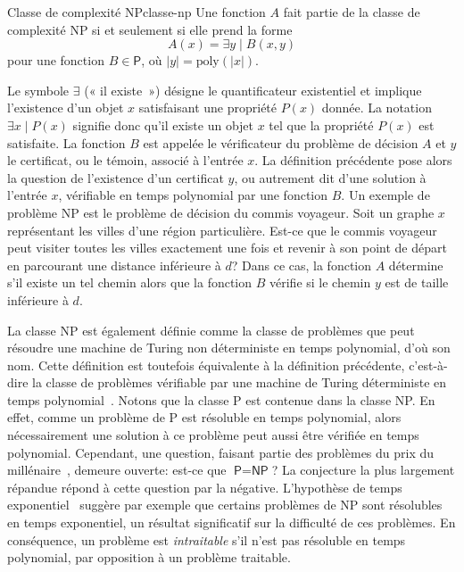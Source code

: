 \begin{maindefinition}{Classe de complexité \textsf{NP}}{classe-np}
    Une fonction $A$ fait partie de la classe de complexité \textsf{NP} si et seulement si elle prend la forme
    \begin{equation*}
        A(x) = \exists y \mid B(x,y)
    \end{equation*}
    pour une fonction $B \in  \textsf{P}$, où $\lvert y \rvert = \mathrm{poly}(\lvert x \rvert)$.
\end{maindefinition}

Le symbole $\exists$ (« il existe ») désigne le quantificateur existentiel et  implique l'existence d'un objet $x$ satisfaisant une propriété $P(x)$ donnée. La notation $\exists x \mid P(x)$ signifie donc qu'il existe un objet $x$ tel que la propriété $P(x)$ est satisfaite. La fonction $B$ est appelée le vérificateur du problème de décision $A$ et $y$ le certificat, ou le témoin, associé à l'entrée $x$. La définition précédente pose alors la question de l'existence d'un certificat $y$, ou autrement dit d'une solution à l'entrée $x$, vérifiable en temps polynomial par une fonction $B$. Un exemple de problème \textsf{NP} est le problème de décision du commis voyageur. Soit un graphe $x$ représentant les villes d'une région particulière. Est-ce que le commis voyageur peut visiter toutes les villes exactement une fois et revenir à son point de départ en parcourant une distance inférieure à $d$? Dans ce cas, la fonction $A$ détermine s'il existe un tel chemin alors que la fonction $B$ vérifie si le chemin $y$ est de taille inférieure à $d$.

La classe \textsf{NP} est également définie comme la classe de problèmes que peut résoudre une machine de Turing non déterministe en temps polynomial, d'où son nom. Cette définition est toutefois équivalente à la définition précédente, c'est-à-dire la classe de problèmes vérifiable par une machine de Turing déterministe en temps polynomial~\cite{sipserIntroductionTheoryComputation1996}. Notons que la classe \textsf{P} est contenue dans la classe \textsf{NP}. En effet, comme un problème de \textsf{P} est résoluble en temps polynomial, alors nécessairement une solution à ce problème peut aussi être vérifiée en temps polynomial. Cependant, une question, faisant partie des problèmes du prix du millénaire~\cite{carlsonMillenniumPrizeProblems2006}, demeure ouverte: est-ce que $\textsf{P} = \textsf{NP}$? La conjecture la plus largement répandue répond à cette question par la négative. L'hypothèse de temps exponentiel~\cite{impagliazzoComplexityKSAT2001} suggère par exemple que certains problèmes de \textsf{NP} sont résolubles en temps exponentiel, un résultat significatif sur la difficulté de ces problèmes. En conséquence, un problème est \textit{intraitable} s'il n'est pas résoluble en temps polynomial, par opposition à un problème traitable. 

